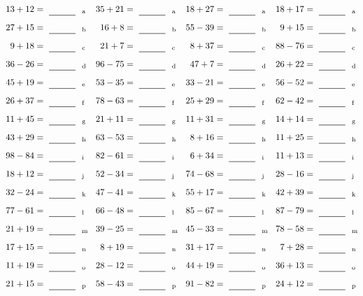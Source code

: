 \documentclass
[
  draft    = true,
  fontsize = 11pt,
  parskip  = half-
]
{scrartcl}
\begin{document}
\clearpage
\begin{align*}
    \pline{13+12}&=\rline{a}
  & \pline{35+21}&=\rline{a}
  & \pline{18+27}&=\rline{a}
  & \pline{18+17}&=\rline{a} \\[1ex]
    \pline{27+15}&=\rline{b}
  & \pline{16+8}&=\rline{b}
  & \pline{55-39}&=\rline{b}
  & \pline{9+15}&=\rline{b} \\[1ex]
    \pline{9+18}&=\rline{c}
  & \pline{21+7}&=\rline{c}
  & \pline{8+37}&=\rline{c}
  & \pline{88-76}&=\rline{c} \\[1ex]
    \pline{36-26}&=\rline{d}
  & \pline{96-75}&=\rline{d}
  & \pline{47+7}&=\rline{d}
  & \pline{26+22}&=\rline{d} \\[1ex]
    \pline{45+19}&=\rline{e}
  & \pline{53-35}&=\rline{e}
  & \pline{33-21}&=\rline{e}
  & \pline{56-52}&=\rline{e} \\[1ex]
    \pline{26+37}&=\rline{f}
  & \pline{78-63}&=\rline{f}
  & \pline{25+29}&=\rline{f}
  & \pline{62-42}&=\rline{f} \\[1ex]
    \pline{11+45}&=\rline{g}
  & \pline{21+11}&=\rline{g}
  & \pline{11+31}&=\rline{g}
  & \pline{14+14}&=\rline{g} \\[1ex]
    \pline{43+29}&=\rline{h}
  & \pline{63-53}&=\rline{h}
  & \pline{8+16}&=\rline{h}
  & \pline{11+25}&=\rline{h} \\[1ex]
    \pline{98-84}&=\rline{i}
  & \pline{82-61}&=\rline{i}
  & \pline{6+34}&=\rline{i}
  & \pline{11+13}&=\rline{i} \\[1ex]
    \pline{18+12}&=\rline{j}
  & \pline{52-34}&=\rline{j}
  & \pline{74-68}&=\rline{j}
  & \pline{28-16}&=\rline{j} \\[1ex]
    \pline{32-24}&=\rline{k}
  & \pline{47-41}&=\rline{k}
  & \pline{55+17}&=\rline{k}
  & \pline{42+39}&=\rline{k} \\[1ex]
    \pline{77-61}&=\rline{l}
  & \pline{66-48}&=\rline{l}
  & \pline{85-67}&=\rline{l}
  & \pline{87-79}&=\rline{l} \\[1ex]
    \pline{21+19}&=\rline{m}
  & \pline{39-25}&=\rline{m}
  & \pline{45-33}&=\rline{m}
  & \pline{78-58}&=\rline{m} \\[1ex]
    \pline{17+15}&=\rline{n}
  & \pline{8+19}&=\rline{n}
  & \pline{31+17}&=\rline{n}
  & \pline{7+28}&=\rline{n} \\[1ex]
    \pline{11+19}&=\rline{o}
  & \pline{28-12}&=\rline{o}
  & \pline{44+19}&=\rline{o}
  & \pline{36+13}&=\rline{o} \\[1ex]
    \pline{21+15}&=\rline{p}
  & \pline{58-43}&=\rline{p}
  & \pline{91-82}&=\rline{p}
  & \pline{24+12}&=\rline{p}
\end{align*}
\end{document}
